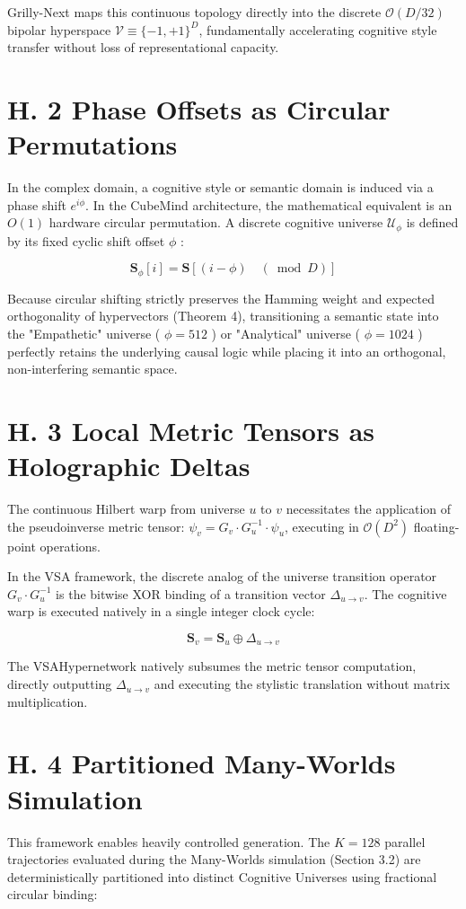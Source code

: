 \documentclass[10pt]{article}
\begin{document}
Grilly-Next maps this continuous topology directly into the discrete $\mathcal{O}(D / 32)$ bipolar hyperspace $\mathcal{V} \equiv\{-1,+1\}^{D}$, fundamentally accelerating cognitive style transfer without loss of representational capacity.

\section*{H. 2 Phase Offsets as Circular Permutations}
In the complex domain, a cognitive style or semantic domain is induced via a phase shift $e^{i \phi}$. In the CubeMind architecture, the mathematical equivalent is an $O(1)$ hardware circular permutation. A discrete cognitive universe $\mathcal{U}_{\phi}$ is defined by its fixed cyclic shift offset $\phi$ :

$$
\mathbf{S}_{\phi}[i]=\mathbf{S}[(i-\phi) \quad(\bmod D)]
$$

Because circular shifting strictly preserves the Hamming weight and expected orthogonality of hypervectors (Theorem 4), transitioning a semantic state into the "Empathetic" universe ( $\phi=512$ ) or "Analytical" universe ( $\phi=1024$ ) perfectly retains the underlying causal logic while placing it into an orthogonal, non-interfering semantic space.

\section*{H. 3 Local Metric Tensors as Holographic Deltas}
The continuous Hilbert warp from universe $u$ to $v$ necessitates the application of the pseudoinverse metric tensor: $\psi_{v}=G_{v} \cdot G_{u}^{-1} \cdot \psi_{u}$, executing in $\mathcal{O}\left(D^{2}\right)$ floating-point operations.

In the VSA framework, the discrete analog of the universe transition operator $G_{v} \cdot G_{u}^{-1}$ is the bitwise XOR binding of a transition vector $\Delta_{u \rightarrow v}$. The cognitive warp is executed natively in a single integer clock cycle:

$$
\mathbf{S}_{v}=\mathbf{S}_{u} \oplus \Delta_{u \rightarrow v}
$$

The VSAHypernetwork natively subsumes the metric tensor computation, directly outputting $\Delta_{u \rightarrow v}$ and executing the stylistic translation without matrix multiplication.

\section*{H. 4 Partitioned Many-Worlds Simulation}
This framework enables heavily controlled generation. The $K=128$ parallel trajectories evaluated during the Many-Worlds simulation (Section 3.2) are deterministically partitioned into distinct Cognitive Universes using fractional circular binding:
\end{document}
